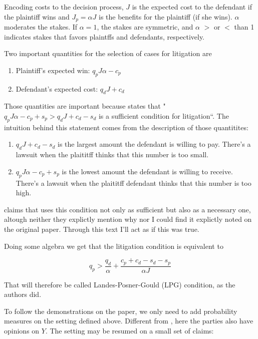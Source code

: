 \documentclass[]{report}
\providecommand{\tightlist}{%
  \setlength{\itemsep}{0pt}\setlength{\parskip}{0pt}}
\theoremstyle{definition}
\theoremstyle{definition}
\theoremstyle{definition}
\theoremstyle{remark}
\begin{document}
Encoding costs to the decision process, \(J\) is the expected cost to
the defendant if the plaintiff wins and \(J_p = \alpha J\) is the
benefits for the plaintiff (if she wins). \(\alpha\) moderates the
stakes. If \(\alpha = 1\), the stakes are symmetric, and \(\alpha\)
\(>\) or \(<\) than 1 indicates stakes that favors plaintffs and
defendants, respectively.

Two important quantities for the selection of cases for litigation are

\begin{enumerate}
\def\labelenumi{\arabic{enumi}.}
\tightlist
\item
  Plaintiff's expected win: \(q_pJ\alpha-c_p\)
\item
  Defendant's expected cost: \(q_dJ+c_d\)
\end{enumerate}

Those quantities are important because \citep{priest1984selection}
states that " \(q_pJ\alpha-c_p+s_p > q_dJ+c_d-s_d\) is a sufficient
condition for litigation``. The intuition behind this statement comes
from the description of those quantitites:

\begin{enumerate}
\def\labelenumi{\arabic{enumi}.}
\tightlist
\item
  \(q_dJ+c_d-s_d\) is the largest amount the defendant is willing to
  pay. There's a lawsuit when the plaititff thinks that this number is
  too small.
\item
  \(q_pJ\alpha-c_p+s_p\) is the lowest amount the defendant is willing
  to receive. There's a lawsuit when the plaititff defendant thinks that
  this number is too high.
\end{enumerate}

\citep{lee2016priest} claims that \citep{priest1984selection} uses this
condition not only as sufficient but also as a necessary one, altough
neither they explictly mention why nor I could find it explictly noted
on the original paper. Through this text I'll act as if this was true.

Doing some algebra we get that the litigation condition is equivalent to

\[ q_p > \frac{q_d}{\alpha} +  \frac{c_p + c_d - s_d-s_p}{\alpha J} \]

That will therefore be called Landes-Posner-Gould (LPG) condition, as
the authors did.

To follow the demonstrations on the paper, we only need to add
probability measures on the setting defined above. Different from
\citep{priest1984selection}, here the parties also have opinions on
\(Y\). The setting may be resumed on a small set of claims:
\end{document}
